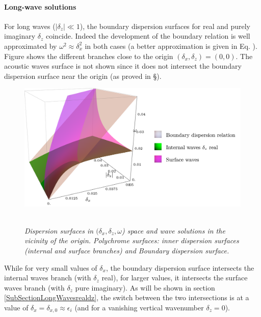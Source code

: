 \paragraph{Long-wave solutions}
For long waves ($|\delta_z| \ll 1$), the boundary dispersion surfaces for real and purely imaginary $\delta_z$ coincide. Indeed the development of the boundary relation is well approximated by $\omega^2\approx \delta_x^2$ in both cases (a better approximation is given in Eq. ).
Figure  shows the different branches close to the origin $(\delta_x, \delta_z)=(0,0)$. The acoustic waves surface is not shown since it does not intersect the boundary dispersion surface near the origin (as proved in \S{}).
\begin{figure}[!h]
	\centering		
		\includegraphics[width=0.6\linewidth]{FIGURES/boundedorigin.png}
	~
	
	\caption{\textit{Dispersion surfaces in $(\delta_x, \delta_z, \omega$) space and wave solutions in the vicinity of the origin. Polychrome surfaces: inner dispersion surfaces (internal and surface branches) and Boundary dispersion surface.
		}
	}
	\label{FigDisLongpSolutions}
\end{figure}
While for very small values of $\delta_x$, the boundary dispersion surface intersects the internal waves branch (with $\delta_z$ real), for larger values, it intersects the surface waves branch (with $\delta_z$ pure imaginary). As will be shown in section \ref{SubSectionLongWavesrealdz}, the switch between the two intersections is at a value of $\delta_x=\delta_{x,0}\approx \epsilon_i$ (and for a vanishing vertical wavenumber $\delta_z=0$).
